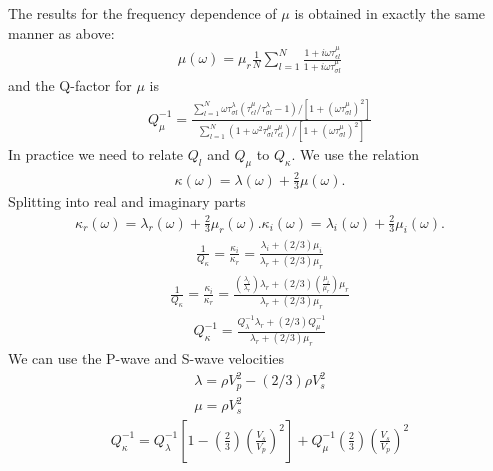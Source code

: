 \documentclass[11pt]{article}
\begin{document}
The results for the frequency dependence of $\mu$ is obtained in exactly the same manner as above:
\begin{eqnarray}
\mu(\omega) = \mu_r \frac{1}{N}\sum_{l=1}^N\frac{1+i\omega\tau^{\mu}_{\epsilon l}}{1+i\omega\tau^{\mu}_{\sigma l}} 
\end{eqnarray}
 and the Q-factor for $\mu$ is
%
\begin{eqnarray}
Q^{-1}_{\mu} = \frac{\sum_{l=1}^N {\omega\tau^{\lambda}_{\sigma l}\left(\tau^{\mu}_{\epsilon l}/\tau^{\lambda}_{\sigma l} -1\right)}
                                           /\left[1 + (\omega\tau^{\mu}_{\sigma l})^2\right] 
                        }
                        {\sum_{l=1}^N (1 + \omega^2\tau^{\mu}_{\sigma l}\tau^{\mu}_{\epsilon l})
                                           /\left[1 + (\omega\tau^{\mu}_{\sigma l})^2\right]       
                        }
\end{eqnarray}
%
In practice we need to relate $Q_l$ and $Q_{\mu}$ to $Q_{\kappa}$. We use the relation
%
\begin{eqnarray}
\kappa(\omega) = \lambda(\omega)+ \frac{2}{3}\mu(\omega).
\end{eqnarray}
%
Splitting into real and imaginary parts
%
\begin{eqnarray}
\kappa_r(\omega) = \lambda_r(\omega)+ \frac{2}{3}\mu_r(\omega).
\kappa_i(\omega) = \lambda_i(\omega)+ \frac{2}{3}\mu_i(\omega).
\end{eqnarray}
%
\begin{eqnarray}
\frac{1}{Q_{\kappa}} = \frac{\kappa_i}{\kappa_r} = \frac{\lambda_i + (2/3)\mu_i}{\lambda_r + (2/3)\mu_r}
\end{eqnarray}
%
%
\begin{eqnarray}
\frac{1}{Q_{\kappa}} = \frac{\kappa_i}{\kappa_r} = \frac{\left(\frac{\lambda_i}{\lambda_r}\right)\lambda_r
                                                   + (2/3)\left(\frac{\mu_i}{\mu_r}\right)\mu_r}
                                                  {\lambda_r + (2/3)\mu_r}
\end{eqnarray}
%
%
\begin{eqnarray}
Q^{-1}_{\kappa} = \frac{Q^{-1}_\lambda \lambda_r + (2/3)Q^{-1}_{\mu}}
                                                  {\lambda_r + (2/3)\mu_r}
\end{eqnarray}
%
We can use the P-wave and S-wave velocities
%
\begin{eqnarray}
\lambda = \rho V^2_p - (2/3)\rho V^2_s \nonumber\\
\mu = \rho V^2_s
\end{eqnarray}
%
\begin{eqnarray}
Q^{-1}_{\kappa} = Q^{-1}_\lambda\left[1-\left(\frac{2}{3}\right)\left(\frac{V_s}{V_p}\right)^2\right]
                  + Q^{-1}_{\mu}\left(\frac{2}{3}\right)\left(\frac{V_s}{V_p}\right)^2
\end{eqnarray}
%
\end{document}
